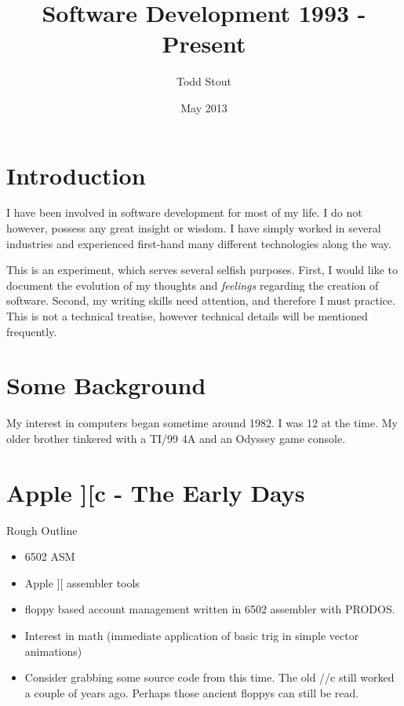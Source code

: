 \documentclass[12pt]{report}
\title{Software Development 1993 - Present}
\author{Todd Stout}
\date{May 2013}
\begin{document}
\maketitle

\section{Introduction}
I have been involved in software development for most of my life. I do
not however, possess any great insight or wisdom. I have simply worked
in several industries and experienced first-hand many different
technologies along the way.

This is an experiment, which serves several selfish purposes. First, I
would like to document the evolution of my thoughts and
\emph{feelings} regarding the creation of software. Second, my writing
skills need attention, and therefore I must practice. This is not a technical
treatise, however technical details will be mentioned frequently.

\pagebreak

%
%
\section{Some  Background}
My interest in computers began sometime around 1982. I was 12 at the
time. My older brother tinkered with a TI/99 4A and an Odyssey game console.
		
\section{Apple ][c - The Early Days}
	Rough Outline
	\begin{itemize}
	\item 6502 ASM
	\item Apple ][ assembler tools
	\item floppy based account management written in 6502 assembler with PRODOS.
	\item Interest in math (immediate application of basic trig in simple vector animations)
	\item Consider grabbing some source code from this time. The old //c still worked a couple of years ago. Perhaps those ancient floppys can still be read.
	\end{itemize}
	
\end{document}
